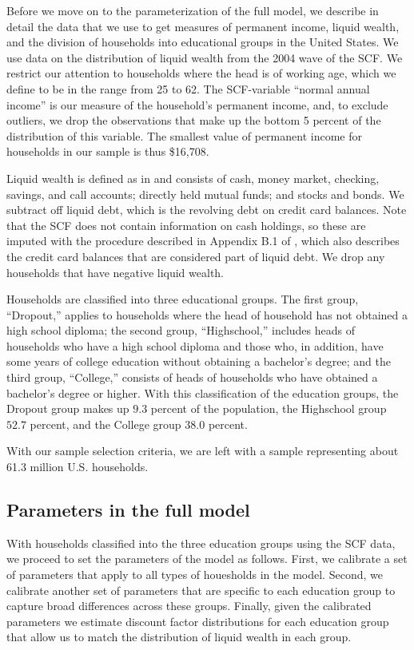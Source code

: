 \documentclass[\econtexRoot/HAFiscal]{subfiles}
\begin{document}
Before we move on to the parameterization of the full model, we describe in detail the data that we use to get measures of permanent income, liquid wealth, and the division of households into educational groups in the United States. We use data on the distribution of liquid wealth from the 2004 wave of the SCF. We restrict our attention to households where the head is of working age, which we define to be in the range from 25 to 62. The SCF-variable ``normal annual income'' is our measure of the household's permanent income, and, to exclude outliers, we drop the observations that make up the bottom 5 percent of the distribution of this variable. The smallest value of permanent income for households in our sample is thus \$16,708. 

Liquid wealth is defined as in \cite{kaplan2014model} and consists of cash, money market, checking, savings, and call accounts; directly held mutual funds; and stocks and bonds. We subtract off liquid debt, which is the revolving debt on credit card balances. Note that the SCF does not contain information on cash holdings, so these are imputed with the procedure described in Appendix B.1 of \cite{kaplan2014model}, which also describes the credit card balances that are considered part of liquid debt. We drop any households that have negative liquid wealth. 

Households are classified into three educational groups. The first group, ``Dropout,'' applies to households where the head of household has not obtained a high school diploma; the second group, ``Highschool,'' includes heads of households who have a high school diploma and those who, in addition, have some years of college education without obtaining a bachelor's degree; and the third group, ``College,'' consists of heads of households who have obtained a bachelor's degree or higher. With this classification of the education groups, the Dropout group makes up $9.3$ percent of the population, the Highschool group $52.7$ percent, and the College group $38.0$ percent. 

With our sample selection criteria, we are left with a sample representing about 61.3 million U.S. households.

\subsection{Parameters in the full model}
\notinsubfile{\label{sec:paramsFull}}

With households classified into the three education groups using the SCF data, we proceed to set the parameters of the model as follows. First, we calibrate a set of parameters that apply to all types of houesholds in the model. Second, we calibrate another set of parameters that are specific to each education group to capture broad differences across these groups. Finally, given the calibrated parameters we estimate discount factor distributions for each education group that allow us to match the distribution of liquid wealth in each group. 
\end{document}
